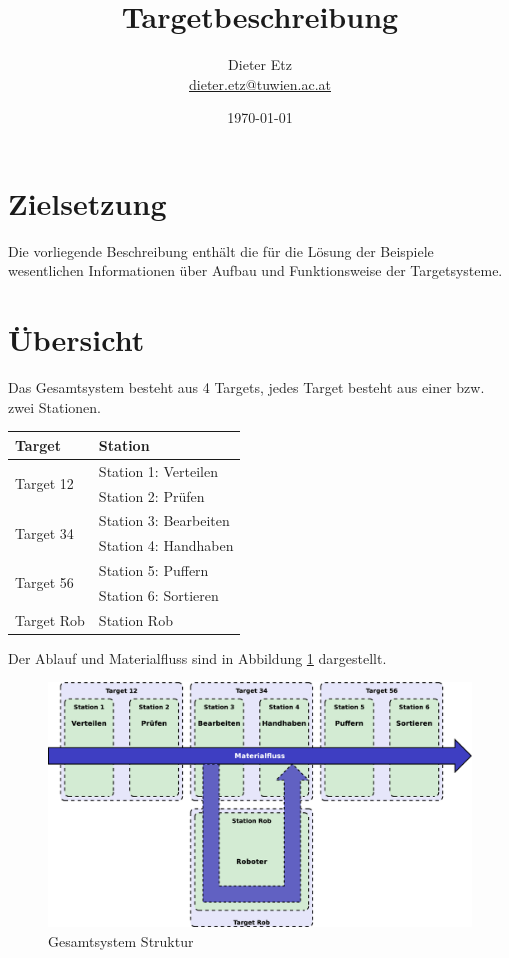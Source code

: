\documentclass[11pt,a4paper,ngerman]{article}
\title {Targetbeschreibung}
\author{Dieter Etz \\ {\small \href{mailto:dieter.etz@tuwien.ac.at}{dieter.etz@tuwien.ac.at}}}
\date{\today}
\begin{document}
\maketitle
\tableofcontents
\newpage

\section{Zielsetzung}

Die vorliegende Beschreibung enthält die für die Lösung der Beispiele wesentlichen Informationen über Aufbau und Funktionsweise der Targetsysteme.


\section{Übersicht}

Das Gesamtsystem besteht aus 4 Targets, jedes Target besteht aus einer bzw. zwei Stationen.
\begin{center}
	\setlength\extrarowheight{4pt}
	\small
	\begin{tabular}{|p{4cm}|p{4cm}|}
		\rowcolor{gray!80}
		\hline
		\bf Target  & \bf Station\\
		\hline\hline
		\multirow{2}{*}{Target 12} & Station 1: Verteilen\\
		 & Station 2: Prüfen\\
		\hline
		\multirow{2}{*}{Target 34} & Station 3: Bearbeiten\\
		& Station 4: Handhaben\\
		\hline
		\multirow{2}{*}{Target 56} & Station 5: Puffern\\
		& Station 6: Sortieren\\
		\hline
		Target Rob & Station Rob\\
		\hline
	\end{tabular}
\end{center}

Der Ablauf und Materialfluss sind in Abbildung \ref{fig_system_structure} dargestellt.

\begin{figure}[!htb]
	\centering
	\includegraphics[width=.99\linewidth]{images/System_Structure}
	\caption{Gesamtsystem Struktur}
	\label{fig_system_structure}
\end{figure}
\end{document}
